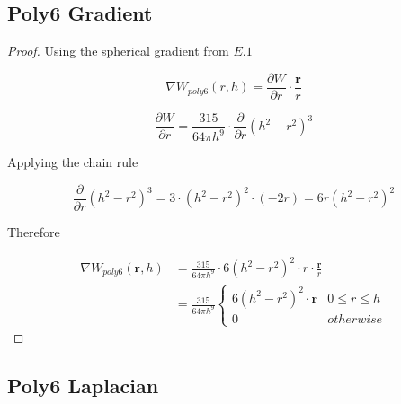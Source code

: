 \documentclass[a4paper, 12pt]{article}
\begin{document}
    \subsection{Poly6 Gradient}

    \begin{proof}
        Using the spherical gradient from $E.1$

        $$\nabla W_{poly6}(r, h) = \frac{\partial{W}}{\partial{r}} \cdot \frac{\textbf{r}}{r}$$

        $$\frac{\partial{W}}{\partial{r}} = \frac{315}{64\pi{h}^9} \cdot \frac{\partial}{\partial{r}} (h^2 - r^2)^3$$

        Applying the chain rule

        $$\frac{\partial}{\partial{r}} (h^2 - r^2)^3 = 3 \cdot (h^2 - r^2)^2 \cdot (-2r) = 6r(h^2 - r^2)^2$$

        Therefore

        \begin{align*}
            \nabla W_{poly6}(\mathbf{r}, h) 
            &= \frac{315}{64\pi h^9} \cdot 6(h^2 - r^2)^2 \cdot r \cdot \frac{\mathbf{r}}{r} \\
            &= \frac{315}{64\pi h^9}
            \begin{cases}
                6(h^2 - r^2)^2 \cdot \textbf{r} & 0 \leq r \leq h \\
                0 & otherwise
            \end{cases}
        \end{align*}
    \end{proof}

    \subsection{Poly6 Laplacian}
\end{document}
